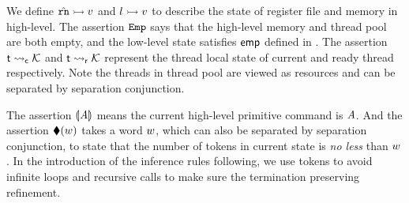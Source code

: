 We define ${\hat{\texttt{rn}}} \rightarrowtail {v}$ and ${l} \rightarrowtail {v}$ 
to describe the state of 
register file and memory in high-level. 
The assertion $\texttt{Emp}$ 
says that the high-level memory and thread pool are 
both empty, and the low-level state satisfies $\textsf{emp}$ 
defined in \Fig{\ref{fig:Semantics of Assertions}}.
The assertion ${\textsf{t}} \leadsto_{\textsf{c}} {\mathcal{K}}$ 
and ${\textsf{t}} \leadsto_{\textsf{r}} {\mathcal{K}}$ represent 
the thread local state of current and ready 
thread respectively. Note the threads in thread pool 
are viewed as resources and can be separated by 
separation conjunction. 

The assertion $\llparenthesis {\textit{A}} \rrparenthesis$ means the 
current high-level primitive command is $\textit{A}$. 
And the assertion $\blacklozenge({w})$ takes a word $w$, 
which can also be separated by separation conjunction, 
to state that the number of tokens in current state is 
\textit{no less} than $w$. In the 
introduction of the inference rules following, we use tokens 
to avoid infinite loops and recursive calls to make sure 
the termination preserving refinement. 


